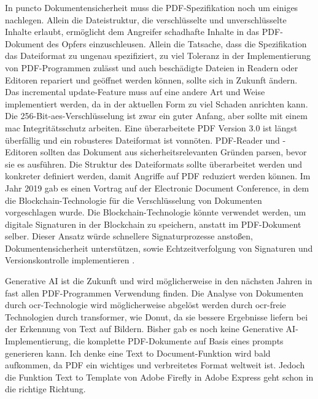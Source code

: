 In puncto Dokumentensicherheit muss die PDF-Spezifikation noch um einiges nachlegen. Allein die Dateistruktur, die verschlüsselte und unverschlüsselte Inhalte erlaubt, ermöglicht dem Angreifer schadhafte Inhalte in das PDF-Dokument des Opfers einzuschleusen. Allein die Tatsache, dass die Spezifikation das Dateiformat zu ungenau spezifiziert, zu viel Toleranz in der Implementierung von PDF-Programmen zulässt und auch beschädigte Dateien in Readern oder Editoren repariert und geöffnet werden können, sollte sich in Zukunft ändern. Das incremental update-Feature muss auf eine andere Art und Weise implementiert werden, da in der aktuellen Form zu viel Schaden anrichten kann. Die 256-Bit-\gls{aes}-Verschlüsselung ist zwar ein guter Anfang, aber sollte mit einem \gls{mac} Integritätsschutz arbeiten. Eine überarbeitete PDF Version 3.0 ist längst überfällig und ein robusteres Dateiformat ist vonnöten. PDF-Reader und -Editoren sollten das Dokument aus sicherheitsrelevanten Gründen parsen, bevor sie es ausführen. Die Struktur des Dateiformats sollte überarbeitet werden und konkreter definiert werden, damit Angriffe auf PDF reduziert werden können. Im Jahr 2019 gab es einen Vortrag auf der Electronic Document Conference, in dem die Blockchain-Technologie für die Verschlüsselung von Dokumenten vorgeschlagen wurde. Die Blockchain-Technologie könnte verwendet werden, um digitale Signaturen in der Blockchain zu speichern, anstatt im PDF-Dokument selber. Dieser Ansatz würde schnellere Signaturprozesse anstoßen, Dokumentensicherheit unterstützen, sowie Echtzeitverfolgung von Signaturen und Versionskontrolle implementieren \cite{pdf-association-blockchain}.
\par
Generative AI ist die Zukunft und wird möglicherweise in den nächsten Jahren in fast allen PDF-Programmen Verwendung finden. Die Analyse von Dokumenten durch \gls{ocr}-Technologie wird möglicherweise abgelöst werden durch \gls{ocr}-freie Technologien durch transformer, wie Donut, da sie bessere Ergebnisse liefern bei der Erkennung von Text auf Bildern. Bisher gab es noch keine Generative AI-Implementierung, die komplette PDF-Dokumente auf Basis eines prompts generieren kann. Ich denke eine Text to Document-Funktion wird bald aufkommen, da PDF ein wichtiges und verbreitetes Format weltweit ist. Jedoch die Funktion Text to Template von Adobe Firefly in Adobe Express geht schon in die richtige Richtung. 